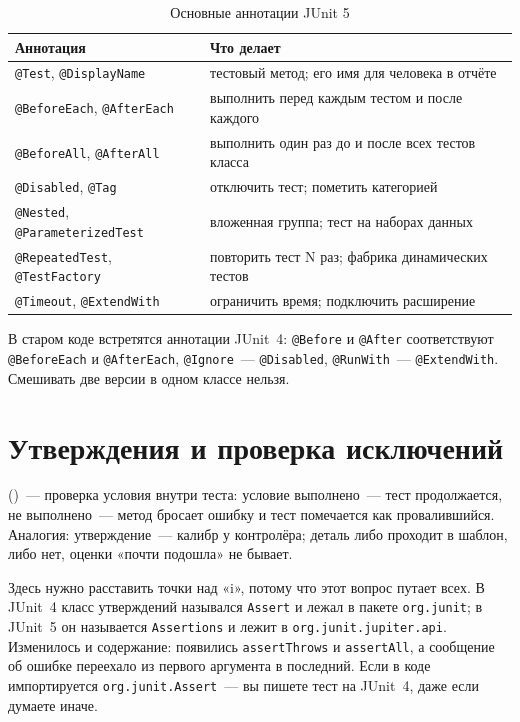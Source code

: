 \begin{table}[htbp]
\caption{Основные аннотации JUnit 5}
\label{tab:10-2}
\centering
\begin{tabular}{L{4.6cm}L{10.4cm}}
\toprule
Аннотация & Что делает \\
\midrule
\texttt{@Test}, \texttt{@DisplayName} & тестовый метод; его имя для человека в отчёте \\
\texttt{@BeforeEach}, \texttt{@AfterEach} & выполнить перед каждым тестом и после каждого \\
\texttt{@BeforeAll}, \texttt{@AfterAll} & выполнить один раз до и после всех тестов класса \\
\texttt{@Disabled}, \texttt{@Tag} & отключить тест; пометить категорией \\
\texttt{@Nested}, \texttt{@ParameterizedTest} & вложенная группа; тест на наборах данных \\
\texttt{@RepeatedTest}, \texttt{@TestFactory} & повторить тест N раз; фабрика динамических тестов \\
\texttt{@Timeout}, \texttt{@ExtendWith} & ограничить время; подключить расширение \\
\bottomrule
\end{tabular}
\end{table}

В старом коде встретятся аннотации JUnit~4: \texttt{@Before} и \texttt{@After} соответствуют \texttt{@BeforeEach} и \texttt{@AfterEach}, \texttt{@Ignore}~--- \texttt{@Disabled}, \texttt{@RunWith}~--- \texttt{@ExtendWith}. Смешивать две версии в одном классе нельзя.

\section{Утверждения и проверка исключений}

 ()~--- проверка условия внутри теста: условие выполнено~--- тест продолжается, не выполнено~--- метод бросает ошибку и тест помечается как провалившийся. Аналогия: утверждение~--- калибр у контролёра; деталь либо проходит в шаблон, либо нет, оценки «почти подошла» не бывает.

Здесь нужно расставить точки над «i», потому что этот вопрос путает всех. В JUnit~4 класс утверждений назывался \texttt{Assert} и лежал в пакете \texttt{org.junit}; в JUnit~5 он называется \texttt{Assertions} и лежит в \texttt{org.junit.jupiter.api}. Изменилось и содержание: появились \texttt{assertThrows} и \texttt{assertAll}, а сообщение об ошибке переехало из первого аргумента в последний. Если в коде импортируется \texttt{org.junit.Assert}~--- вы пишете тест на JUnit~4, даже если думаете иначе.


